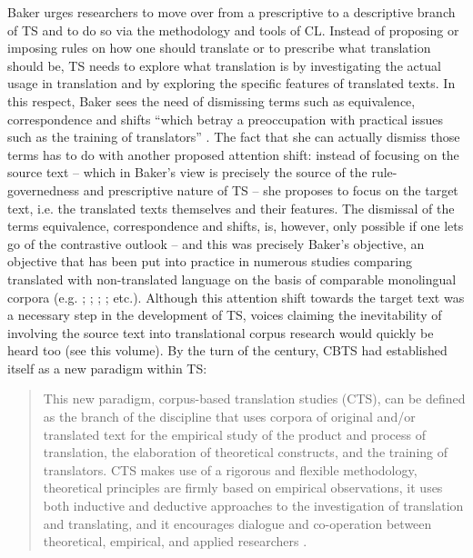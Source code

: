 Baker urges researchers to move over from a prescriptive to a descriptive branch of TS and to do so via the methodology and tools of CL. Instead of proposing or imposing rules on how one should translate or to prescribe what translation should be, TS needs to explore what translation is by investigating the actual usage in translation and by exploring the specific features of translated texts. In this respect, Baker sees the need of dismissing terms such as equivalence, correspondence and shifts “which betray a preoccupation with practical issues such as the training of translators” \citep[235]{baker_corpus_1993}. The fact that she can actually dismiss those terms has to do with another proposed attention shift: instead of focusing on the source text – which in Baker’s view is precisely the source of the rule-governedness and prescriptive nature of TS – she proposes to focus on the target text, i.e. the translated texts themselves and their features. The dismissal of the terms equivalence, correspondence and shifts, is, however, only possible if one lets go of the contrastive outlook – and this was precisely Baker’s objective, an objective that has been put into practice in numerous studies comparing translated with non-translated language on the basis of comparable monolingual corpora (e.g. \citealt{laviosa_core_1998};  \citealt{OlohanBaker2000}; \citealt{mutesayire_apposition_2004}; \citealt{xiao_how_2010}; etc.). Although this attention shift towards the target text was a necessary step in the development of TS, voices claiming the inevitability of involving the source text into translational corpus research would quickly be heard too (see this volume). By the turn of the century, CBTS had established itself as a new paradigm within TS:


\begin{quote}
This new paradigm, corpus-based translation studies (CTS), can be defined as the branch of the discipline that uses corpora of original and/or translated text for the empirical study of the product and process of translation, the elaboration of theoretical constructs, and the training of translators. CTS makes use of a rigorous and flexible methodology, theoretical principles are firmly based on empirical observations, it uses both inductive and deductive approaches to the investigation of translation and translating, and it encourages dialogue and co-operation between theoretical, empirical, and applied researchers \citep[45]{granger_corpora_2003}.
\end{quote}


